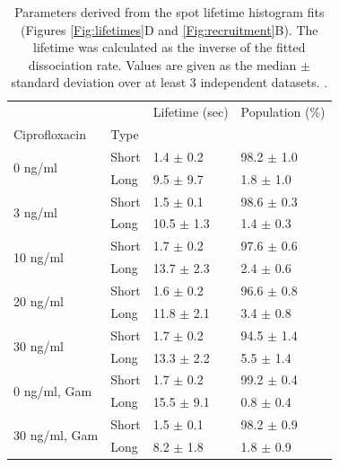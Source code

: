 \begin{table}[htbp]
    \centering
    \caption{Parameters derived from the spot lifetime histogram fits (Figures \ref{Fig:lifetimes}D and \ref{Fig:recruitment}B). The lifetime was calculated as the inverse of the fitted dissociation rate. Values are given as the median $\pm$ standard deviation over at least 3 independent datasets. . }
    \begin{tabular}{llll}
        \toprule
         &  & Lifetime (sec) & Population (\%) \\
        Ciprofloxacin & Type &  &  \\
        \midrule
        \multirow[t]{2}{*}{0 ng/ml} & Short & 1.4 $\pm$ 0.2 & 98.2 $\pm$ 1.0 \\
         & Long & 9.5 $\pm$ 9.7 & 1.8 $\pm$ 1.0 \\
        \cline{1-4}
        \multirow[t]{2}{*}{3 ng/ml} & Short & 1.5 $\pm$ 0.1 & 98.6 $\pm$ 0.3 \\
         & Long & 10.5 $\pm$ 1.3 & 1.4 $\pm$ 0.3 \\
        \cline{1-4}
        \multirow[t]{2}{*}{10 ng/ml} & Short & 1.7 $\pm$ 0.2 & 97.6 $\pm$ 0.6 \\
         & Long & 13.7 $\pm$ 2.3 & 2.4 $\pm$ 0.6 \\
        \cline{1-4}
        \multirow[t]{2}{*}{20 ng/ml} & Short & 1.6 $\pm$ 0.2 & 96.6 $\pm$ 0.8 \\
         & Long & 11.8 $\pm$ 2.1 & 3.4 $\pm$ 0.8 \\
        \cline{1-4}
        \multirow[t]{2}{*}{30 ng/ml} & Short & 1.7 $\pm$ 0.2 & 94.5 $\pm$ 1.4 \\
         & Long & 13.3 $\pm$ 2.2 & 5.5 $\pm$ 1.4 \\
        \cline{1-4}
        \midrule
        \multirow[t]{2}{*}{0 ng/ml, Gam} & Short & 1.7 $\pm$ 0.2 & 99.2 $\pm$ 0.4 \\
         & Long & 15.5 $\pm$ 9.1 & 0.8 $\pm$ 0.4 \\
        \cline{1-4}
        \multirow[t]{2}{*}{30 ng/ml, Gam} & Short & 1.5 $\pm$ 0.1 & 98.2 $\pm$ 0.9 \\
        & Long & 8.2 $\pm$ 1.8 & 1.8 $\pm$ 0.9 \\
        \bottomrule
        \end{tabular}
    \label{tab:fit_results}
\end{table}

